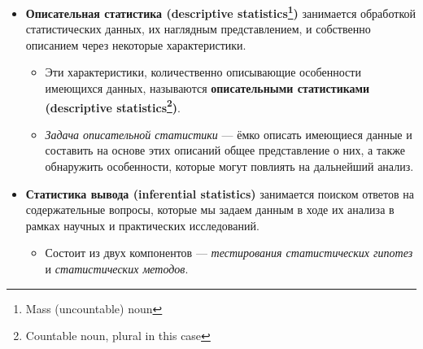 \documentclass[
  letterpaper,
  DIV=11,
  numbers=noendperiod]{scrreprt}
\providecommand{\tightlist}{%
  \setlength{\itemsep}{0pt}\setlength{\parskip}{0pt}}\usepackage{longtable,booktabs,array}
\theoremstyle{definition}
\theoremstyle{remark}
\begin{document}
\begin{itemize}
\tightlist
\item
  \textbf{Описательная статистика (descriptive statistics\footnote{Mass
    (uncountable) noun})} занимается обработкой статистических данных,
  их наглядным представлением, и собственно описанием через некоторые
  характеристики.

  \begin{itemize}
  \tightlist
  \item
    Эти характеристики, количественно описывающие особенности имеющихся
    данных, называются \textbf{описательными статистиками (descriptive
    statistics\footnote{Countable noun, plural in this case})}.
  \item
    \emph{Задача описательной статистики} --- ёмко описать имеющиеся
    данные и составить на основе этих описаний общее представление о
    них, а также обнаружить особенности, которые могут повлиять на
    дальнейший анализ.
  \end{itemize}
\item
  \textbf{Статистика вывода (inferential statistics)} занимается поиском
  ответов на содержательные вопросы, которые мы задаем данным в ходе их
  анализа в рамках научных и практических исследований.

  \begin{itemize}
  \tightlist
  \item
    Состоит из двух компонентов --- \emph{тестирования статистических
    гипотез} и \emph{статистических методов}.
  \end{itemize}
\end{itemize}
\end{document}
